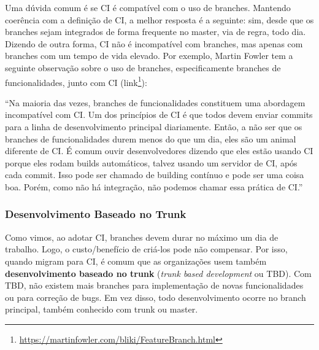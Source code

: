\documentclass[
  11pt,
  twoside]{book}
\DeclareRobustCommand{\href}[2]{#2\footnote{\url{#1}}}
\renewenvironment{quote}{\centering \vspace{1.5ex} \begin{tcolorbox}[colback=backcolor, width=4.9in]}{\end{tcolorbox}}
\begin{document}
Uma dúvida comum é se CI é compatível com o uso de branches. Mantendo
coerência com a definição de CI, a melhor resposta é a seguinte: sim,
desde que os branches sejam integrados de forma frequente no master, via
de regra, todo dia. Dizendo de outra forma, CI não é incompatível com
branches, mas apenas com branches com um tempo de vida elevado. Por
exemplo, Martin Fowler tem a seguinte observação sobre o uso de
branches, especificamente branches de funcionalidades, junto com CI
(\href{https://martinfowler.com/bliki/FeatureBranch.html}{link}):

\newpage


\begin{quote}
``Na maioria das vezes, branches de funcionalidades constituem uma
abordagem incompatível com CI. Um dos princípios de CI é que todos devem
enviar commits para a linha de desenvolvimento principal diariamente.
Então, a não ser que os branches de funcionalidades durem menos do que
um dia, eles são um animal diferente de CI. É comum ouvir
desenvolvedores dizendo que eles estão usando CI porque eles rodam
builds automáticos, talvez usando um servidor de CI, após cada commit.
Isso pode ser chamado de building contínuo e pode ser uma coisa boa.
Porém, como não há integração, não podemos chamar essa prática de CI.''
\end{quote}

\hypertarget{desenvolvimento-baseado-no-trunk}{%
\subsubsection*{Desenvolvimento Baseado no
Trunk}\label{desenvolvimento-baseado-no-trunk}}

 

Como vimos, ao adotar CI, branches devem durar no máximo um dia de
trabalho. Logo, o custo/benefício de criá-los pode não compensar. Por
isso, quando migram para CI, é comum que as organizações usem também
\textbf{desenvolvimento baseado no trunk} (\emph{trunk based
development} ou TBD). Com TBD, não existem mais branches para
implementação de novas funcionalidades ou para correção de bugs. Em vez
disso, todo desenvolvimento ocorre no branch principal, também conhecido
com trunk ou master.
\end{document}

